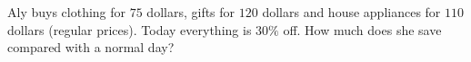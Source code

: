 Aly buys clothing for $75$ dollars, gifts for $120$ dollars and house appliances for $110$ dollars (regular prices). Today everything is $30\%$ off. How much does she save compared with a normal day?
